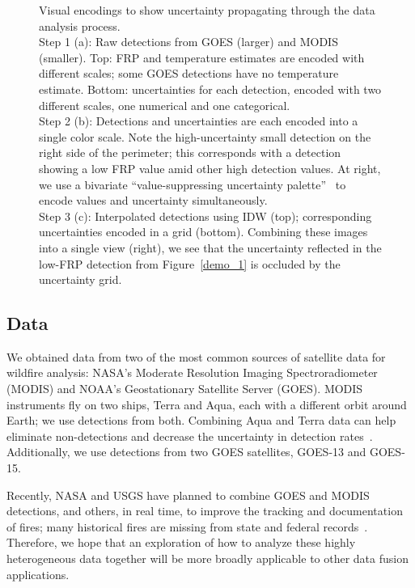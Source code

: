 \begin{figure}[h]
     \caption{Visual encodings to show uncertainty propagating through the data analysis process. \\Step 1 (a): Raw detections from GOES (larger) and MODIS (smaller). Top: FRP and temperature estimates are encoded with different scales; some GOES detections have no temperature estimate. Bottom: uncertainties for each detection, encoded with two different scales, one numerical and one categorical. \\Step 2 (b): Detections and uncertainties are each encoded into a single color scale. Note the high-uncertainty small detection on the right side of the perimeter; this corresponds with a detection showing a low FRP value amid other high detection values. At right, we use a bivariate ``value-suppressing uncertainty palette''~\cite{VSUP} to encode values and uncertainty simultaneously. \\Step 3 (c): Interpolated detections using IDW (top); corresponding uncertainties encoded in a grid (bottom). Combining these images into a single view (right), we see that the uncertainty reflected in the low-FRP detection from Figure~\ref{demo_1} is occluded by the uncertainty grid.}
     \label{summary_figure}
\end{figure}

\subsection{Data}
We obtained data from two of the most common sources of satellite data for wildfire analysis: NASA's Moderate Resolution Imaging Spectroradiometer (MODIS) and NOAA's Geostationary Satellite Server (GOES). MODIS instruments fly on two ships, Terra and Aqua, each with a different orbit around Earth; we use detections from both. Combining Aqua and Terra data can help eliminate non-detections and decrease the uncertainty in detection rates~\cite{Hawbaker2008}. Additionally, we use detections from two GOES satellites, GOES-13 and GOES-15.

Recently, NASA and USGS have planned to combine GOES and MODIS detections, and others, in real time, to improve the tracking and documentation of fires; many historical fires are missing from state and federal records~\cite{Howard2014}. Therefore, we hope that an exploration of how to analyze these highly heterogeneous data together will be more broadly applicable to other data fusion applications.


